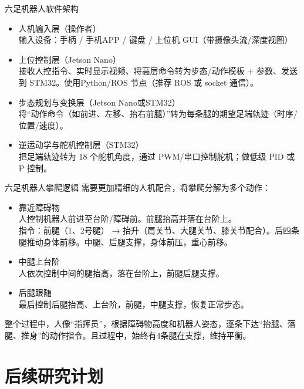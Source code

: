 \documentclass{beamer}
\begin{document}
\begin{frame}{六足机器人软件架构}
    \begin{itemize}
        \item 人机输入层（操作者）
        \\ 输入设备：手柄 / 手机APP / 键盘 / 上位机 GUI（带摄像头流/深度视图）
        \item 上位控制层（Jetson Nano）
        \\ 接收人控指令、实时显示视频、将高层命令转为步态/动作模板 + 参数、发送到 STM32。使用Python/ROS 节点（推荐 ROS 或 socket 通信）。
        \item 步态规划与变换层（Jetson Nano或STM32）
        \\ 将“动作命令（如前进、左移、抬右前腿）”转为每条腿的期望足端轨迹（时序/位置/速度）。
        \item 逆运动学与舵机控制层（STM32）
        \\ 把足端轨迹转为 18 个舵机角度，通过 PWM/串口控制舵机；做低级 PID 或 P 控制。
    \end{itemize}
\end{frame}

\begin{frame}{六足机器人攀爬逻辑}
    需要更加精细的人机配合，将攀爬分解为多个动作：
    \begin{itemize}
        \item 靠近障碍物
        \\ 人控制机器人前进至台阶/障碍前。前腿抬高并落在台阶上。
        \\指令：前腿（1、2号腿） → 抬升（肩关节、大腿关节、膝关节配合）。后四条腿推动身体前移。中腿、后腿支撑，身体前压，重心前移。
        \item 中腿上台阶
        \\ 人依次控制中间的腿抬高，落在台阶上，前腿后腿支撑。
        \item 后腿跟随
        \\ 最后控制后腿抬高、上台阶，前腿，中腿支撑，恢复正常步态。
    \end{itemize}
    整个过程中，人像“指挥员”，根据障碍物高度和机器人姿态，逐条下达“抬腿、落腿、推身”的动作指令。且过程中，始终有4条腿在支撑，维持平衡。
\end{frame}

\section{后续研究计划}

\end{document}
